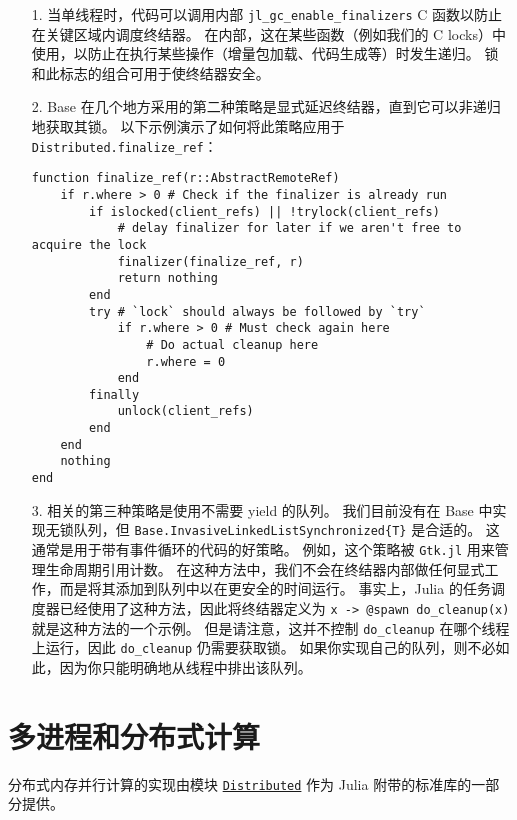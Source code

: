 \begin{itemize}
\item[1. ] 当单线程时，代码可以调用内部 \texttt{jl\_gc\_enable\_finalizers} C 函数以防止在关键区域内调度终结器。 在内部，这在某些函数（例如我们的 C locks）中使用，以防止在执行某些操作（增量包加载、代码生成等）时发生递归。 锁和此标志的组合可用于使终结器安全。


\item[2. ] Base 在几个地方采用的第二种策略是显式延迟终结器，直到它可以非递归地获取其锁。 以下示例演示了如何将此策略应用于 \texttt{Distributed.finalize\_ref}：


\begin{verbatim}
function finalize_ref(r::AbstractRemoteRef)
    if r.where > 0 # Check if the finalizer is already run
        if islocked(client_refs) || !trylock(client_refs)
            # delay finalizer for later if we aren't free to acquire the lock
            finalizer(finalize_ref, r)
            return nothing
        end
        try # `lock` should always be followed by `try`
            if r.where > 0 # Must check again here
                # Do actual cleanup here
                r.where = 0
            end
        finally
            unlock(client_refs)
        end
    end
    nothing
end
\end{verbatim}


\item[3. ] 相关的第三种策略是使用不需要 yield 的队列。 我们目前没有在 Base 中实现无锁队列，但 \texttt{Base.InvasiveLinkedListSynchronized\{T\}} 是合适的。 这通常是用于带有事件循环的代码的好策略。 例如，这个策略被 \texttt{Gtk.jl} 用来管理生命周期引用计数。 在这种方法中，我们不会在终结器内部做任何显式工作，而是将其添加到队列中以在更安全的时间运行。 事实上，Julia 的任务调度器已经使用了这种方法，因此将终结器定义为 \texttt{x -> @spawn do\_cleanup(x)} 就是这种方法的一个示例。 但是请注意，这并不控制 \texttt{do\_cleanup} 在哪个线程上运行，因此 \texttt{do\_cleanup} 仍需要获取锁。 如果你实现自己的队列，则不必如此，因为你只能明确地从线程中排出该队列。

\end{itemize}


\hypertarget{5767475590552724220}{}


\chapter{多进程和分布式计算}



分布式内存并行计算的实现由模块 \hyperlink{11988382873486720115}{\texttt{Distributed}} 作为 Julia 附带的标准库的一部分提供。



